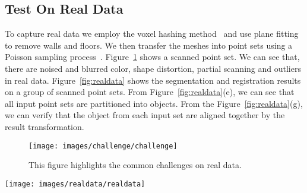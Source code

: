 \subsection{Test On Real Data}
To capture real data we employ the voxel hashing method~\cite{VXH} and use plane fitting to remove walls and floors. 
%
We then transfer the meshes into point sets using a Poisson sampling process~\cite{PossionSampling}.
%
Figure~\ref{fig:challenge} shows a scanned point set. We can see that, there are noised and blurred color, shape distortion, partial scanning and outliers in real data.
%
Figure~{\ref{fig:realdata}} shows the segmentation and registration results on a group of scanned point sets.
From Figure~\ref{fig:realdata}(e), we can see that all input point sets are partitioned into objects. From the Figure~\ref{fig:realdata}(g), we can verify that the object from each input set are aligned together by the result transformation.
\begin{figure}
	\centering
	\texttt{[image: images/challenge/challenge]}
	\caption{\label{fig:challenge}This figure highlights the common challenges on real data.}
\end{figure}
\begin{figure*}
	\centering
	\texttt{[image: images/realdata/realdata]}
	\caption{\label{fig:realdata} Segmentation and registration on real data. (a) Scanned mesh using method in \cite{VXH}. (b) Remove walls and floors by plane fitting. (c) Sampled point set using \cite{PossionSampling}. (d) With roughly placed boxes on only one point set, the points are initially segmented in this one point set. Note that parts of the chair legs are segmented to the table due to the rough box placement by users. (e) Pairs of input point sets and corresponding segmentation results. (f) The final Gaussian centroids for the five objects in the scene. (g) Verification of the registration result by aligning all point sets with respect to each object. The light blue rectangle highlights the object that is aligned together. Except the aligned object, the other objects are placed quite messy since they came from different point sets and have different arrangement relative to the aligned object.   }
\end{figure*} 


%
